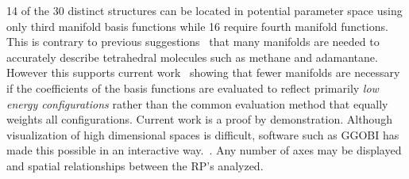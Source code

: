 \documentclass[preprint]{iucr}              %
\newcommand{\mb}[1]{\ensuremath{\mbox{\boldmath $ #1 $}}}
\begin{document}
14 of the 30 distinct structures can be located in potential
parameter space using only third manifold basis functions while 16
require fourth manifold functions. This is contrary to previous
suggestions~\cite{Briels80} that many manifolds are needed to
accurately describe tetrahedral molecules such as methane and
adamantane. However this supports current work~\cite{Missaghi04}
showing that fewer manifolds are necessary if the coefficients of
the basis functions are evaluated to reflect primarily \emph{low
energy configurations} rather than the common evaluation method that
equally weights all configurations. Current work is a proof by
demonstration. Although visualization of high dimensional spaces is difficult,
software such as {G\footnotesize GOBI} has made this possible in an
interactive way.~\cite{ggobi03}.  Any number of axes may be displayed and
spatial relationships between the RP's analyzed.



\end{document}
